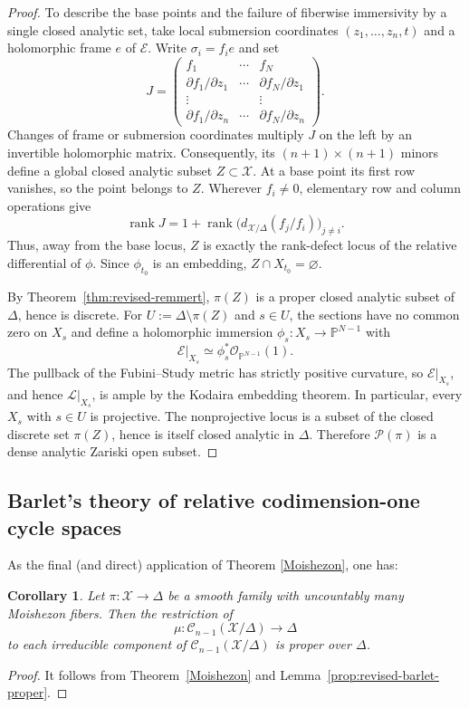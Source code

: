 \documentclass[11pt]{amsart}
\numberwithin{equation}{section}
\theoremstyle{plain}
\newtheorem{cor}[thm]{Corollary}
\theoremstyle{definition}
\newcommand{\cE}{\mathcal E}
\newcommand{\cL}{\mathcal L}
\newcommand{\cO}{\mathcal O}
\newcommand{\cX}{\mathcal X}
\begin{document}
\begin{proof}
To describe the base points and the failure of fiberwise immersivity
by a single closed analytic set, take local submersion coordinates
$(z_1,\ldots,z_n,t)$ and a holomorphic frame $e$ of $\cE$.
Write $\sigma_i=f_i e$ and set
\[
 J=\begin{pmatrix}
 f_1&\cdots&f_N\\
 \partial f_1/\partial z_1&\cdots&\partial f_N/\partial z_1\\
 \vdots&&\vdots\\
 \partial f_1/\partial z_n&\cdots&\partial f_N/\partial z_n
 \end{pmatrix}.
\]
Changes of frame or submersion coordinates multiply $J$ on the left
by an invertible holomorphic matrix.  Consequently, its
$(n+1)\times(n+1)$ minors define a global closed analytic subset
$Z\subset\cX$.  At a base point its first row vanishes, so the point
belongs to $Z$.  Wherever $f_i\ne0$, elementary row and column
operations give
\[
 \operatorname{rank}J
 =1+\operatorname{rank}
 \bigl(d_{\cX/\Delta}(f_j/f_i)\bigr)_{j\ne i}.
\]
Thus, away from the base locus, $Z$ is exactly the rank-defect locus
of the relative differential of $\phi$.  Since $\phi_{t_0}$ is an
embedding, $Z\cap X_{t_0}=\varnothing$.

By Theorem~\ref{thm:revised-remmert}, $\pi(Z)$ is a proper closed analytic subset of
$\Delta$, hence is discrete.  For $U:=\Delta\setminus\pi(Z)$ and
$s\in U$, the sections have no common zero on $X_s$ and define a
holomorphic immersion $\phi_s:X_s\to\mathbb P^{N-1}$ with
\[
 \cE|_{X_s}\simeq\phi_s^*\cO_{\mathbb P^{N-1}}(1).
\]
The pullback of the Fubini--Study metric has strictly positive curvature,
so $\cE|_{X_s}$, and hence $\cL|_{X_s}$, is ample by the Kodaira
embedding theorem.  In particular, every $X_s$ with $s\in U$ is
projective.  The nonprojective locus is a subset of the closed discrete
set $\pi(Z)$, hence is itself closed analytic in $\Delta$.
Therefore $\mathcal P(\pi)$ is a dense analytic Zariski open subset.
\end{proof}

\subsection{Barlet's theory of relative codimension-one cycle spaces}
As the final (and direct) application of Theorem \ref{Moishezon}, one has:
\begin{cor}
Let $\pi: \cX\rightarrow\Delta$ be a smooth family with uncountably many Moishezon fibers.  Then the restriction of
$$\mu: \mathcal{C}_{n-1}(\cX/\Delta)\rightarrow \Delta$$
to each irreducible component of $\mathcal{C}_{n-1}(\cX/\Delta)$ is proper over $\Delta$.
\end{cor}
\begin{proof}
It follows from Theorem~\ref{Moishezon} and
Lemma~\ref{prop:revised-barlet-proper}.
\end{proof}
\end{document}

